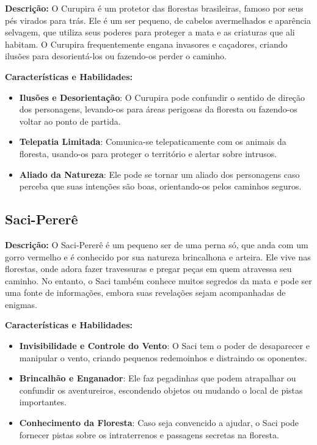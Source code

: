 \textbf{Descrição:}  
O Curupira é um protetor das florestas brasileiras, famoso por seus pés virados para trás. Ele é um ser pequeno, de cabelos avermelhados e aparência selvagem, que utiliza seus poderes para proteger a mata e as criaturas que ali habitam. O Curupira frequentemente engana invasores e caçadores, criando ilusões para desorientá-los ou fazendo-os perder o caminho.

\textbf{Características e Habilidades:}
\begin{itemize}
    \item \textbf{Ilusões e Desorientação}: O Curupira pode confundir o sentido de direção dos personagens, levando-os para áreas perigosas da floresta ou fazendo-os voltar ao ponto de partida.
    \item \textbf{Telepatia Limitada}: Comunica-se telepaticamente com os animais da floresta, usando-os para proteger o território e alertar sobre intrusos.
    \item \textbf{Aliado da Natureza}: Ele pode se tornar um aliado dos personagens caso perceba que suas intenções são boas, orientando-os pelos caminhos seguros.
\end{itemize}

\subsection{Saci-Pererê}

\textbf{Descrição:}  
O Saci-Pererê é um pequeno ser de uma perna só, que anda com um gorro vermelho e é conhecido por sua natureza brincalhona e arteira. Ele vive nas florestas, onde adora fazer travessuras e pregar peças em quem atravessa seu caminho. No entanto, o Saci também conhece muitos segredos da mata e pode ser uma fonte de informações, embora suas revelações sejam acompanhadas de enigmas.

\textbf{Características e Habilidades:}
\begin{itemize}
    \item \textbf{Invisibilidade e Controle do Vento}: O Saci tem o poder de desaparecer e manipular o vento, criando pequenos redemoinhos e distraindo os oponentes.
    \item \textbf{Brincalhão e Enganador}: Ele faz pegadinhas que podem atrapalhar ou confundir os aventureiros, escondendo objetos ou mudando o local de pistas importantes.
    \item \textbf{Conhecimento da Floresta}: Caso seja convencido a ajudar, o Saci pode fornecer pistas sobre os intraterrenos e passagens secretas na floresta.
\end{itemize}

